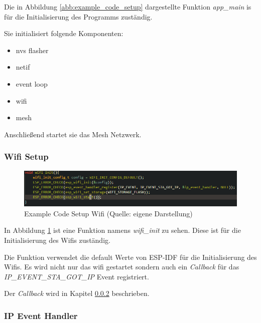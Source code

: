 Die in Abbildung \ref{abb:example_code_setup} dargestellte Funktion \textit{app\_main} is für die Initialisierung des Programms zuständig.

Sie initialisiert folgende Komponenten:

\begin{itemize}
    \item nvs flasher
    \item netif
    \item event loop
    \item wifi
    \item mesh
\end{itemize}

Anschließend startet sie das Mesh Netzwerk.

\subsubsection{Wifi Setup}

\begin{figure}[H]
    \begin{center}
        \includegraphics[scale=0.]{images/example_code_setup_wifi.png}
        \caption{Example Code Setup Wifi (Quelle: eigene Darstellung)}
        \label{abb:example_code_setup_wifi}
    \end{center}
\end{figure}

In Abbildung \ref{abb:example_code_setup_wifi} ist eine Funktion namens \textit{wifi\_init} zu sehen. Diese ist für die Initialisierung des Wifis zuständig.

Die Funktion verwendet die default Werte von ESP-IDF für die Initialisierung des Wifis.
Es wird nicht nur das wifi gestartet sondern auch ein \textit{Callback} für das \textit{IP\_EVENT\_STA\_GOT\_IP} Event registriert.

Der \textit{Callback} wird in Kapitel \ref{sec:example-code-event-handler} beschrieben.

\subsubsection{IP Event Handler}\label{sec:example-code-event-handler}

